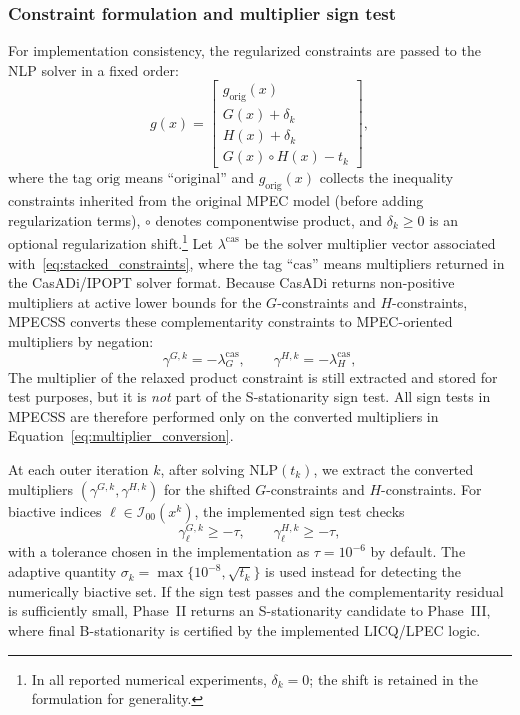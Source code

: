 \subsubsection{Constraint formulation and multiplier sign test}
\label{sec:stacking_signs}
For implementation consistency, the regularized constraints are passed to the NLP solver in a fixed order:
\begin{equation}
g(x)=\begin{bmatrix}
g_{\mathrm{orig}}(x)\\
G(x)+\delta_k\\
H(x)+\delta_k\\
G(x)\circ H(x)-t_k
\end{bmatrix},
\label{eq:stacked_constraints}
\end{equation}
where the tag $\mathrm{orig}$ means ``original'' and
$g_{\mathrm{orig}}(x)$ collects the inequality constraints
inherited from the original MPEC model (before adding regularization
terms), $\circ$ denotes componentwise product, and $\delta_k \geq 0$
is an optional regularization shift.\footnote{%
  In all reported numerical experiments, $\delta_k = 0$; the shift is
  retained in the formulation for generality.} Let
$\lambda^{\mathrm{cas}}$ be the solver multiplier vector associated
with~\eqref{eq:stacked_constraints}, where the tag ``$\mathrm{cas}$''
means multipliers returned in the CasADi/IPOPT solver format.
Because CasADi returns non-positive multipliers at active lower bounds
for the $G$-constraints and $H$-constraints, MPECSS converts these complementarity
constraints to MPEC-oriented multipliers by negation:
\begin{equation}
\gamma^{G,k} = -\lambda^{\mathrm{cas}}_{G},\qquad
\gamma^{H,k} = -\lambda^{\mathrm{cas}}_{H},
\label{eq:multiplier_conversion}
\end{equation}
The multiplier of the relaxed product constraint is still extracted and
stored for test purposes, but it is \emph{not} part of the
S-stationarity sign test. All sign tests in MPECSS are therefore
performed only on the converted multipliers in
Equation~\eqref{eq:multiplier_conversion}.

At each outer iteration $k$, after solving $\text{NLP}(t_k)$, we
extract the converted multipliers $(\gamma^{G,k},\gamma^{H,k})$ for
the shifted $G$-constraints and $H$-constraints. For biactive indices
$\ell \in \mathcal{I}_{00}(x^k)$, the implemented sign test checks
\[
\gamma^{G,k}_\ell \ge -\tau,\qquad
\gamma^{H,k}_\ell \ge -\tau,
\]
with a tolerance chosen in the implementation as
$\tau=10^{-6}$ by default. The adaptive quantity
$\sigma_k=\max\{10^{-8},\sqrt{t_k}\}$ is used instead for detecting the
numerically biactive set. If the sign test passes and the complementarity
residual is sufficiently small, Phase~II returns an S-stationarity
candidate to Phase~III, where final B-stationarity is certified by the
implemented LICQ/LPEC logic.

